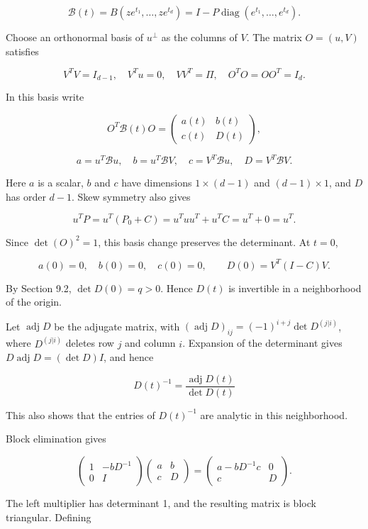 \documentclass[11pt,a4paper]{article}
\providecommand{\mathscr}[1]{\mathcal{#1}}
\begin{document}
\[
\mathscr B(t)=B(ze^{t_1},\ldots,ze^{t_d})
=I-P\operatorname{diag}(e^{t_1},\ldots,e^{t_d}).
\]

Choose an orthonormal basis of \(u^\perp\) as the columns of \(V\). The matrix \(O=(u,V)\) satisfies

\[
V^TV=I_{d-1},\quad V^Tu=0,\quad VV^T=\Pi,
\quad O^TO=OO^T=I_d.
\]

In this basis write

\[
O^T\mathscr B(t)O=
\begin{pmatrix}a(t)&b(t)\\c(t)&D(t)\end{pmatrix},
\]

\[
a=u^T\mathscr Bu,\quad b=u^T\mathscr BV,\quad
c=V^T\mathscr Bu,\quad D=V^T\mathscr BV.
\]

Here \(a\) is a scalar, \(b\) and \(c\) have dimensions \(1\times(d-1)\) and \((d-1)\times1\), and \(D\) has order \(d-1\). Skew symmetry also gives

\[
u^TP=u^T(P_0+C)=u^Tuu^T+u^TC=u^T+0=u^T.
\]

Since \(\det(O)^2=1\), this basis change preserves the determinant. At \(t=0\),

\[
a(0)=0,\quad b(0)=0,\quad c(0)=0,
\qquad D(0)=V^T(I-C)V.
\]

By Section 9.2, \(\det D(0)=q>0\). Hence \(D(t)\) is invertible in a neighborhood of the origin.

Let \(\operatorname{adj}D\) be the adjugate matrix, with \((\operatorname{adj}D)_{ij}=(-1)^{i+j}\det D^{(j|i)}\), where \(D^{(j|i)}\) deletes row \(j\) and column \(i\). Expansion of the determinant gives \(D\operatorname{adj}D=(\det D)I\), and hence

\[
D(t)^{-1}=\frac{\operatorname{adj}D(t)}{\det D(t)}
\]

This also shows that the entries of \(D(t)^{-1}\) are analytic in this neighborhood.

Block elimination gives

\[
\begin{pmatrix}1&-bD^{-1}\\0&I\end{pmatrix}
\begin{pmatrix}a&b\\c&D\end{pmatrix}
=
\begin{pmatrix}a-bD^{-1}c&0\\c&D\end{pmatrix}.
\]

The left multiplier has determinant 1, and the resulting matrix is block triangular. Defining
\end{document}
